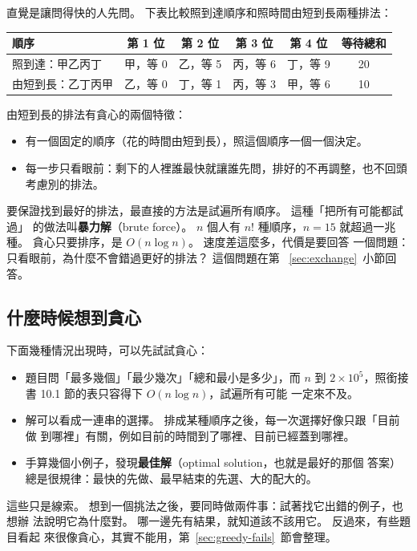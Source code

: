 直覺是讓問得快的人先問。 下表比較照到達順序和照時間由短到長兩種排法：

\begin{center}
\begin{tabular}{lcccc|c}
\toprule
順序 & 第 1 位 & 第 2 位 & 第 3 位 & 第 4 位 & 等待總和 \\
\midrule
照到達：甲乙丙丁 & 甲，等 0 & 乙，等 5 & 丙，等 6 & 丁，等 9 & 20 \\
由短到長：乙丁丙甲 & 乙，等 0 & 丁，等 1 & 丙，等 3 & 甲，等 6 & 10 \\
\bottomrule
\end{tabular}
\end{center}

由短到長的排法有貪心的兩個特徵：

\begin{itemize}
\item 有一個固定的順序（花的時間由短到長），照這個順序一個一個決定。
\item 每一步只看眼前：剩下的人裡誰最快就讓誰先問，排好的不再調整，也不回頭
考慮別的排法。
\end{itemize}

要保證找到最好的排法，最直接的方法是試遍所有順序。 這種「把所有可能都試過」
的做法叫\textbf{暴力解}（brute force）。 $n$ 個人有 $n!$ 種順序，$n = 15$
就超過一兆種。 貪心只要排序，是 $O(n \log n)$。 速度差這麼多，代價是要回答
一個問題：只看眼前，為什麼不會錯過更好的排法？ 這個問題在第
~\ref{sec:exchange}~小節回答。

\subsection{什麼時候想到貪心}

下面幾種情況出現時，可以先試試貪心：

\begin{itemize}
\item 題目問「最多幾個」「最少幾次」「總和最小是多少」，而 $n$ 到
$2 \times 10^5$，照銜接書 10.1 節的表只容得下 $O(n \log n)$，試遍所有可能
一定來不及。
\item 解可以看成一連串的選擇。 排成某種順序之後，每一次選擇好像只跟「目前做
到哪裡」有關，例如目前的時間到了哪裡、目前已經蓋到哪裡。
\item 手算幾個小例子，發現\textbf{最佳解}（optimal solution，也就是最好的那個
答案）總是很規律：最快的先做、最早結束的先選、大的配大的。
\end{itemize}

這些只是線索。 想到一個挑法之後，要同時做兩件事：試著找它出錯的例子，也想辦
法說明它為什麼對。 哪一邊先有結果，就知道該不該用它。 反過來，有些題目看起
來很像貪心，其實不能用，第~\ref{sec:greedy-fails}~節會整理。

